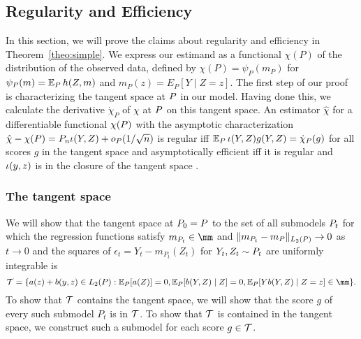 \subsection{Regularity and Efficiency}
\label{sec:proof-of-efficiency} 

In this section, we will prove the claims about regularity and efficiency in Theorem~\ref{theo:simple}. We express our estimand
as a functional $\chi(P)$ of the distribution of the observed data, defined by $\chi(P)=\psi_P(m_P)$ for $\psi_P(m) = \E_P h(Z,m)$ and $m_P(z)=E_P[Y \mid Z=z]$.
The first step of our proof is characterizing the tangent space at $\P$ in our model. 
Having done this, we calculate the derivative $\dot\chi_P$ of $\chi$ at $\P$ on this tangent space.
An estimator $\hat \chi$ for a differentiable functional $\chi(\P)$ with the asymptotic characterization 
$\hat \chi - \chi(\P) = \Pn \influence(Y,Z) + o_P(1/\sqrt{n})$ 
is regular iff $\E_P \influence(Y,Z)g(Y,Z) = \dot\chi_P(g)$ for all scores $g$ in the tangent space and
asymptotically efficient iff it is regular and $\iota(y,z)$ is in the closure of the tangent space \citep[Section 1.2 and Example 4.6]{van2000semiparametric}.

\subsubsection{The tangent space}
We will show that the tangent space at $\P_0=\P$ to the set of all submodels $\P_t$ 
for which the regression functions satisfy $m_{\P_t} \in \mm$
and $\norm{m_{\P_t} - m_{\P}}_{L_2(\P)} \to 0$ as $t \to 0$ and the squares of $\epsilon_t=Y_t-m_{P_t}(Z_t)$ for $Y_t,Z_t \sim \P_t$ are uniformly integrable is
\[ \tangent = \set*{ a(z) + b(y,z) \in L_2(\P) : \E_P[a(Z)]=0, \E_P[b(Y,Z) \mid Z]=0, \E_P[Y b(Y,Z) \mid Z=z] \in \mm}. \]
To show that $\mathcal{T}$ contains the tangent space, we will show that
the score $g$ of every such submodel $P_t$ is in $\mathcal{T}$.
To show that $\mathcal{T}$ is contained in the tangent space, we construct such a submodel
for each score $g \in \mathcal{T}$. 

